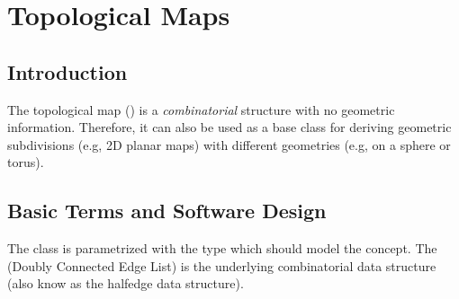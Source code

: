 
\def\Ipe#1{\def\IPEfile{#1}}

\renewcommand{\Re}{{\rm I\!\hspace{-0.025em} R}}
\newcommand{\normal}[1]{\eta_{#1}}
\newenvironment{dfn}{{\vspace*{1ex} \noindent \bf Definition }}{\vspace*{1ex}}
\newcommand{\bigdef}[2]{\index{#1}\begin{dfn} {\rm #2} \end{dfn}}
\newenvironment{proof}{{\em Proof:}}{\hfill{\hfill\rule{2mm}{2mm}}}

\newcommand{\comment}[1]{{\sf * #1 *}}
\newcommand{\ncomment}[1]{\noindent {\sf * #1 * }}

\newcommand{\intsupplanes}{P} 
\def\C{{\cal C}}
\def\G{{\cal G}}
\def\F{{\cal F}}
\def\I{{\cal I}}
\def\U{{\cal U}}
\def\M{{\cal M}}
\def\eps{{\varepsilon}}
\def\bd{{\partial}}
\def\dm{{\cal D}}
\newcommand{\Section}[1]{Section~{\protect\ref{#1}}}
\newcommand{\Chapter}[1]{Chapter~{\protect\ref{#1}}}

\ccParDims

\chapter{Topological Maps}
\label{I1_ChapterTopologicalMap}

\section{Introduction}
\label{TPM_sec:intro}
   The topological map () is a {\em
   combinatorial} structure with no geometric information. Therefore,
   it can also be used as a base class for deriving geometric
   subdivisions (e.g, 2D planar maps) with different geometries (e.g,
   on a sphere or torus). 

\section{Basic Terms and Software Design}
   The class is parametrized with the  type which should
   model the  concept. The  (Doubly
   Connected Edge List) is the underlying combinatorial data structure
   (also know as the halfedge data structure).

